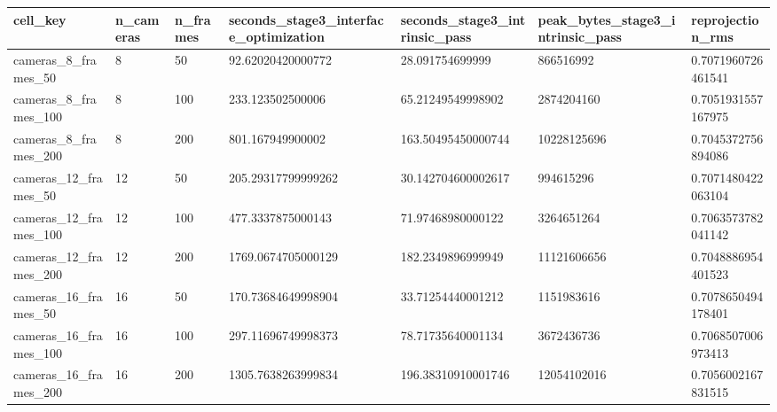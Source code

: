 \begin{tabular}{|l|l|l|l|l|l|l|}
\hline
cell\_key & n\_cameras & n\_frames & seconds\_stage3\_interface\_optimization & seconds\_stage3\_intrinsic\_pass & peak\_bytes\_stage3\_intrinsic\_pass & reprojection\_rms \\
\hline
cameras\_8\_frames\_50 & 8 & 50 & 92.62020420000772 & 28.091754699999 & 866516992 & 0.7071960726461541 \\
cameras\_8\_frames\_100 & 8 & 100 & 233.123502500006 & 65.21249549998902 & 2874204160 & 0.7051931557167975 \\
cameras\_8\_frames\_200 & 8 & 200 & 801.167949900002 & 163.50495450000744 & 10228125696 & 0.7045372756894086 \\
cameras\_12\_frames\_50 & 12 & 50 & 205.29317799999262 & 30.142704600002617 & 994615296 & 0.7071480422063104 \\
cameras\_12\_frames\_100 & 12 & 100 & 477.3337875000143 & 71.97468980000122 & 3264651264 & 0.7063573782041142 \\
cameras\_12\_frames\_200 & 12 & 200 & 1769.0674705000129 & 182.2349896999949 & 11121606656 & 0.7048886954401523 \\
cameras\_16\_frames\_50 & 16 & 50 & 170.73684649998904 & 33.71254440001212 & 1151983616 & 0.7078650494178401 \\
cameras\_16\_frames\_100 & 16 & 100 & 297.11696749998373 & 78.71735640001134 & 3672436736 & 0.7068507006973413 \\
cameras\_16\_frames\_200 & 16 & 200 & 1305.7638263999834 & 196.38310910001746 & 12054102016 & 0.7056002167831515 \\
\hline
\end{tabular}


